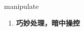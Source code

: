 
\begin{frame}
{\huge manipulate}
\begin{center}
\begin{enumerate}\Large
  \item \textbf{巧妙处理，暗中操控}
\end{enumerate}
\end{center}
\end{frame}
